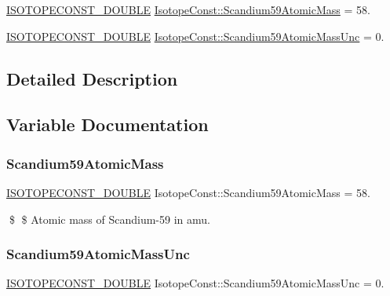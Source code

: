 \begin{DoxyCompactItemize}
\item 
\mbox{\hyperlink{group___isotope_const-_macros_ga8f45a7272ce02c0b4c65c44636ed719a}{I\+S\+O\+T\+O\+P\+E\+C\+O\+N\+S\+T\+\_\+\+D\+O\+U\+B\+LE}} \mbox{\hyperlink{group___isotope_const-_scandium-_sc59_ga523eeef5888e4c86fc430b5aa74368f6}{Isotope\+Const\+::\+Scandium59\+Atomic\+Mass}} = 58.
\item 
\mbox{\hyperlink{group___isotope_const-_macros_ga8f45a7272ce02c0b4c65c44636ed719a}{I\+S\+O\+T\+O\+P\+E\+C\+O\+N\+S\+T\+\_\+\+D\+O\+U\+B\+LE}} \mbox{\hyperlink{group___isotope_const-_scandium-_sc59_gaca130685a1f088bc8b9356bf3d7be7be}{Isotope\+Const\+::\+Scandium59\+Atomic\+Mass\+Unc}} = 0.
\end{DoxyCompactItemize}


\subsection{Detailed Description}


\subsection{Variable Documentation}
\mbox{\label{group___isotope_const-_scandium-_sc59_ga523eeef5888e4c86fc430b5aa74368f6}} 
\subsubsection{\texorpdfstring{Scandium59\+Atomic\+Mass}{Scandium59AtomicMass}}
{\footnotesize\ttfamily \mbox{\hyperlink{group___isotope_const-_macros_ga8f45a7272ce02c0b4c65c44636ed719a}{I\+S\+O\+T\+O\+P\+E\+C\+O\+N\+S\+T\+\_\+\+D\+O\+U\+B\+LE}} Isotope\+Const\+::\+Scandium59\+Atomic\+Mass = 58.}

\$ \$ Atomic mass of Scandium-\/59 in amu. \mbox{\label{group___isotope_const-_scandium-_sc59_gaca130685a1f088bc8b9356bf3d7be7be}} 
\subsubsection{\texorpdfstring{Scandium59\+Atomic\+Mass\+Unc}{Scandium59AtomicMassUnc}}
{\footnotesize\ttfamily \mbox{\hyperlink{group___isotope_const-_macros_ga8f45a7272ce02c0b4c65c44636ed719a}{I\+S\+O\+T\+O\+P\+E\+C\+O\+N\+S\+T\+\_\+\+D\+O\+U\+B\+LE}} Isotope\+Const\+::\+Scandium59\+Atomic\+Mass\+Unc = 0.}

